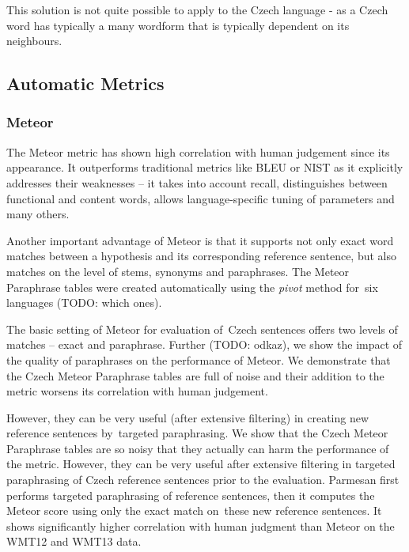 \documentclass[11pt]{article}
\begin{document}
This solution is not quite possible to apply to the Czech language - as a Czech word has typically a 
many wordform that is typically dependent on its neighbours.


\subsection{Automatic Metrics}
\subsubsection{Meteor}
The Meteor metric \cite{meteor-wmt:2011} has shown high correlation with human 
judgement since its appearance. It outperforms traditional metrics like BLEU \cite{bleu} 
or NIST \cite{nist} as it explicitly addresses their weaknesses -- it takes into account 
recall, distinguishes between functional and content words, allows language-specific 
tuning of parameters and many others.

Another important advantage of Meteor is that it supports not only exact word matches 
between a hypothesis and its corresponding reference sentence, but also matches on the 
level of stems, synonyms and paraphrases. The Meteor Paraphrase tables \cite{meteor-tables} 
were created automatically using the \textit{pivot} method \cite{pivoting} for~six languages 
(TODO: which ones).

The basic setting of Meteor for evaluation of~Czech sentences offers two levels of matches -- 
exact and paraphrase. Further (TODO: odkaz), we show the impact of the quality of paraphrases 
on the performance of Meteor. We demonstrate that the Czech Meteor Paraphrase tables are full 
of noise and their addition to the metric worsens its correlation with human judgement. 

However, they can be very useful (after extensive filtering) in creating new reference sentences 
by~targeted paraphrasing. 
We show that the Czech Meteor Paraphrase tables are so noisy that they actually can harm 
the performance of the metric. However, they can be very useful after extensive filtering 
in targeted paraphrasing of Czech reference sentences prior to the evaluation.
Parmesan first performs targeted paraphrasing of reference sentences, then it computes 
the Meteor score using only the exact match on~these new reference sentences. It shows 
significantly higher correlation with human judgment than Meteor on the WMT12 and WMT13 data. 
\end{document}
